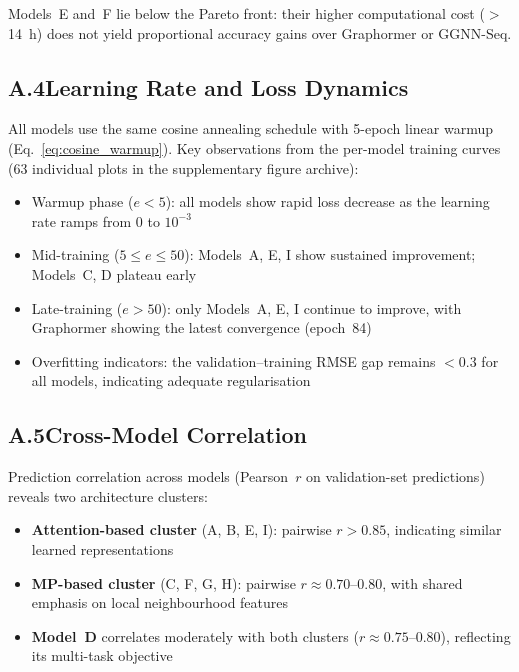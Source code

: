 \documentclass[11pt]{article}
\begin{document}
\noindent
Models~E and~F lie below the Pareto front: their higher computational
cost ($>$14~h) does not yield proportional accuracy gains over
Graphormer or GGNN-Seq.

\subsection*{A.4\quad Learning Rate and Loss Dynamics}

All models use the same cosine annealing schedule with 5-epoch linear
warmup (Eq.~\ref{eq:cosine_warmup}).
Key observations from the per-model training curves
(63 individual plots in the supplementary figure archive):
\begin{itemize}[leftmargin=1.5em]
  \item Warmup phase ($e < 5$): all models show rapid loss decrease as
    the learning rate ramps from 0 to $10^{-3}$
  \item Mid-training ($5 \leq e \leq 50$): Models~A, E, I show
    sustained improvement; Models~C, D plateau early
  \item Late-training ($e > 50$): only Models~A, E, I continue to
    improve, with Graphormer showing the latest convergence (epoch~84)
  \item Overfitting indicators: the validation--training RMSE gap
    remains $< 0.3$ for all models, indicating adequate regularisation
\end{itemize}

\subsection*{A.5\quad Cross-Model Correlation}

Prediction correlation across models (Pearson~$r$ on validation-set
predictions) reveals two architecture clusters:
\begin{itemize}[leftmargin=1.5em]
  \item \textbf{Attention-based cluster} (A, B, E, I):
    pairwise $r > 0.85$, indicating similar learned representations
  \item \textbf{MP-based cluster} (C, F, G, H):
    pairwise $r \approx 0.70$--$0.80$, with shared emphasis on local
    neighbourhood features
  \item \textbf{Model~D} correlates moderately with both clusters
    ($r \approx 0.75$--$0.80$), reflecting its multi-task objective
\end{itemize}

\label{app:results_end}
\end{document}
